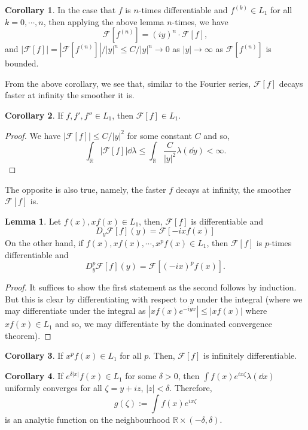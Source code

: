\documentclass[]{article}
\theoremstyle{definition}
\newtheorem{corollary}{Corollary}[theorem]
\theoremstyle{definition}
\newtheorem{lemma}{Lemma}[section]
\begin{document}
\begin{corollary}
  In the case that \(f\) is \(n\)-times differentiable and \(f^(k) \in L_1\)
  for all \(k = 0, \cdots, n\), then applying the above lemma \(n\)-times, 
  we have 
  \[\mathcal{F}[f^{(n)}] = (iy)^n \cdot \mathcal{F}[f],\]
  and \(|\mathcal{F}[f]| = |\mathcal{F}[f^{(n)}]| / |y|^n \le C / |y|^n
    \to 0\) as \(|y| \to \infty\) as \(\mathcal{F}[f^{(n)}]\) is bounded.
\end{corollary}

From the above corollary, we see that, similar to the Fourier series, \(\mathcal{F}[f]\) 
decays faster at infinity the smoother it is. 

\begin{corollary}
  If \(f, f', f'' \in L_1\), then \(\mathcal{F}[f] \in L_1\).
\end{corollary}
\begin{proof}
  We have \(|\mathcal{F}[f]| \le C / |y|^2\) for some constant \(C\) and 
  so, 
  \[\int_{\mathbb{R}} |\mathcal{F}[f]| \dd\lambda \le 
    \int_{\mathbb{R}} \frac{C}{|y|^2} \lambda(\dd y) < \infty.\]
\end{proof}

The opposite is also true, namely, the faster \(f\) decays at infinity, the 
smoother \(\mathcal{F}[f]\) is.

\begin{lemma}
  Let \(f(x), xf(x) \in L_1\), then, \(\mathcal{F}[f]\) is differentiable and 
  \[D_y \mathcal{F}[f](y) = \mathcal{F}[-ixf(x)]\]
  On the other hand, if \(f(x), xf(x), \cdots, x^pf(x) \in L_1\), then 
  \(\mathcal{F}[f]\) is \(p\)-times differentiable and 
  \[D^p_y \mathcal{F}[f](y) = \mathcal{F}[(-ix)^pf(x)].\]
\end{lemma}
\begin{proof}
  It suffices to show the first statement as the second follows by induction. 
  But this is clear by differentiating with respect to \(y\) under the integral 
  (where we may differentiate under the integral as \(|xf(x)e^{-iyx}| \le |xf(x)|\)
  where \(xf(x) \in L_1\) and so, we may differentiate by the dominated convergence 
  theorem).
\end{proof}

\begin{corollary}
  If \(x^pf(x) \in L_1\) for all \(p\). Then, \(\mathcal{F}[f]\) is infinitely 
  differentiable. 
\end{corollary}

\begin{corollary}
  If \(e^{\delta |x|}f(x) \in L_1\) for some \(\delta > 0\), then 
  \(\int f(x)e^{ix \zeta} \lambda(\dd x)\) uniformly converges for all 
  \(\zeta = y + iz\), \(|z| < \delta\). Therefore, 
  \[g(\zeta) := \int f(x) e^{ix\zeta}\]
  is an analytic function on the neighbourhood \(\mathbb{R} \times (-\delta, \delta)\).
\end{corollary}
\end{document}
